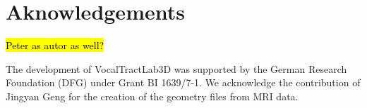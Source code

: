 \documentclass[]{article}
\begin{document}
	\section{Aknowledgements}
	
	\hl{Peter as autor as well?}
	
	The development of VocalTractLab3D was supported by the German Research Foundation (DFG) under Grant BI 1639/7-1.
	We acknowledge the contribution of Jingyan Geng for the creation of the geometry files 
	from MRI data.
	
	\printbibliography
\end{document}
